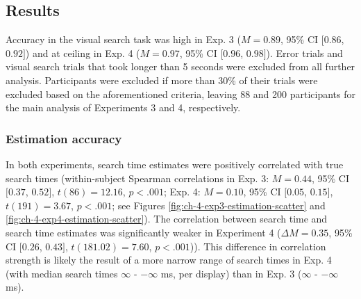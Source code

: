 \documentclass[12pt,twoside]{reedthesis}
\begin{document}
\hypertarget{results-3}{%
\subsection{Results}\label{results-3}}

Accuracy in the visual search task was high in Exp. 3 (\(M = 0.89\), 95\% CI \([0.86\), \(0.92]\)) and at ceiling in Exp. 4 (\(M = 0.97\), 95\% CI \([0.96\), \(0.98]\)).
Error trials and visual search trials that took longer than 5 seconds were excluded from all further analysis. Participants were excluded if more than 30\% of their trials were excluded based on the aforementioned criteria, leaving 88 and 200 participants for the main analysis of Experiments 3 and 4, respectively.

\hypertarget{estimation-accuracy-1}{%
\subsubsection*{Estimation accuracy}\label{estimation-accuracy-1}}

In both experiments, search time estimates were positively correlated with true search times (within-subject Spearman correlations in Exp. 3: \(M = 0.44\), 95\% CI \([0.37\), \(0.52]\), \(t(86) = 12.16\), \(p < .001\); Exp. 4: \(M = 0.10\), 95\% CI \([0.05\), \(0.15]\), \(t(191) = 3.67\), \(p < .001\); see Figures \ref{fig:ch-4-exp3-estimation-scatter} and \ref{fig:ch-4-exp4-estimation-scatter}). The correlation between search time and search time estimates was significantly weaker in Experiment 4 (\(\Delta M = 0.35\), 95\% CI \([0.26\), \(0.43]\), \(t(181.02) = 7.60\), \(p < .001\))). This difference in correlation strength is likely the result of a more narrow range of search times in Exp. 4 (with median search times \ensuremath{\infty{}} - \ensuremath{-\infty{}} ms, per display) than in Exp. 3 (\ensuremath{\infty{}} - \ensuremath{-\infty{}} ms).
\end{document}
